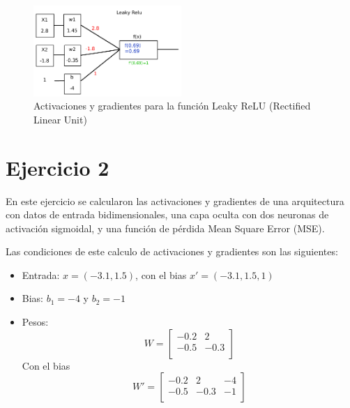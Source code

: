 \begin{enumerate}[label=(\alph*)]
    \begin{figure}[H]
        \begin{small}
            \begin{center}
                \includegraphics[width=0.5\textwidth]{Graphs/ejer1d.pdf}
            \end{center}
            \caption{Activaciones y gradientes para la función Leaky ReLU (Rectified Linear Unit)}
            \label{fig:1d}
        \end{small}
    \end{figure}

\end{enumerate}

\section*{Ejercicio 2}

En este ejercicio se calcularon las activaciones y gradientes de una arquitectura con datos de entrada bidimensionales, una capa oculta con dos neuronas de activación sigmoidal, y una función de pérdida Mean Square Error (MSE).

Las condiciones de este calculo de activaciones y gradientes son  las siguientes:
\begin{itemize}
    \item Entrada: $x= (-3.1, 1.5)$, con  el bias $x'=(-3.1, 1.5, 1)$
    \item Bias: $b_1=-4$  y $b_2=-1$
    \item Pesos: \[ W=
        \begin{bmatrix}
            -0.2 & 2  \\ 
            -0.5 &-0.3 \\
        \end{bmatrix}
        \]
        Con el bias
        \[ W'=
        \begin{bmatrix}
            -0.2 & 2  & -4\\ 
            -0.5 &-0.3 & -1\\
        \end{bmatrix}
        \]
\end{itemize}

